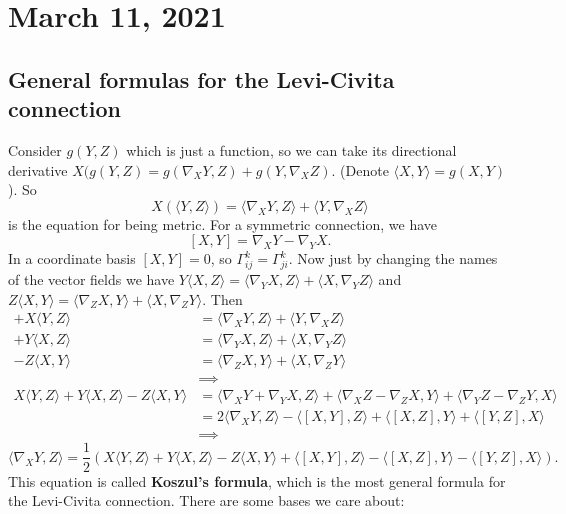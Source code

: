\section{March 11, 2021} 

\subsection{General formulas for the Levi-Civita connection}
Consider $g(Y,Z)$ which is just a function, so we can take its directional derivative $X(g(Y,Z)=g(\nabla_XY,Z)+g(Y,\nabla_XZ)$. (Denote $\langle X,Y \rangle =g(X,Y)$). So \[
    X(\langle Y,Z \rangle )=\langle \nabla_XY,Z \rangle +\langle Y,\nabla_XZ \rangle 
\] is the equation for being metric. For a symmetric connection, we have \[
[X,Y]=\nabla_XY-\nabla_YX.
\] In a coordinate basis $[X,Y]=0$, so $\Gamma _{ij}^k=\Gamma _{ji}^k$. Now just by changing the names of the vector fields we have  $Y\langle X,Z \rangle =\langle \nabla_YX,Z \rangle +\langle X,\nabla_YZ \rangle $ and $Z\langle X,Y \rangle =\langle \nabla_ZX,Y \rangle +\langle X,\nabla_ZY \rangle $. Then
\begin{align*}
    +X\langle Y,Z \rangle &=\langle \nabla_XY,Z \rangle +\langle Y,\nabla_XZ \rangle \\
    +Y\langle X,Z \rangle &=\langle \nabla_YX,Z \rangle +\langle X,\nabla_YZ \rangle \\
    -Z\langle X,Y \rangle &=\langle \nabla_ZX,Y \rangle +\langle X,\nabla_ZY \rangle \\ &\implies \\
    X\langle Y,Z \rangle +Y\langle X,Z \rangle -Z\langle X,Y \rangle &=\langle \nabla_XY+\nabla_YX,Z \rangle +\langle \nabla_XZ-\nabla_ZX,Y \rangle +\langle \nabla_YZ-\nabla_ZY,X \rangle \\
                                                                     &=2\langle \nabla_XY,Z \rangle -\langle [X,Y],Z \rangle +\langle [X,Z],Y \rangle +\langle [Y,Z],X\rangle \\ &\implies 
\end{align*}
\[
 \boxed{    \langle \nabla_XY,Z \rangle =\frac{1}{2}\left( X\langle Y,Z \rangle +Y\langle X,Z \rangle -Z\langle X,Y \rangle +\langle [X,Y],Z \rangle -\langle [X,Z],Y \rangle -\langle [Y,Z],X \rangle  \right) .}
\] This equation is called \textbf{Koszul's formula}, which is the most general formula for the Levi-Civita connection. There are some bases we care about:
